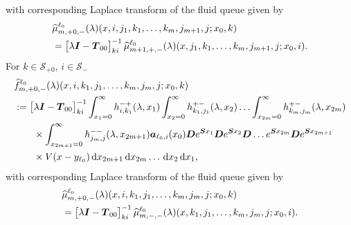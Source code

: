 with corresponding Laplace transform of the fluid queue given by 
\begin{align}
		&\widehat{\mu}_{m,+0,-}^{\ell_0}(\lambda)(x,i,j_1,k_1,\dots,k_m,j_{m+1},j;x_0,k) \nonumber 
		\\&=\begin{bmatrix} \lambda \boldsymbol I - \boldsymbol T_{00} \end{bmatrix}^{-1}_{ki}\widehat{\mu}_{m+1,+,-}^{\ell_0}(\lambda)(x,j_1,k_1,\dots,k_m,j_{m+1},j;x_0,i).
		\label{eqn: k0jJ0asfcavv134asdga}
\end{align} 
For \(k\in\mathcal S_{+0}\), \(i\in\mathcal S_-\)
\begin{align}
	&\widehat{f}_{m,+0,-}^{\ell_0}(\lambda)(x,i,k_1,j_1,\dots,k_{m},j_{m},j;x_0,k)\nonumber 
	\\&:=\begin{bmatrix} \lambda \boldsymbol I - \boldsymbol T_{00} \end{bmatrix}^{-1}_{ki}\int_{x_1=0}^\infty h^{-+}_{i,k_{1}}(\lambda,x_1)\nonumber
	\int_{x_2=0}^\infty h^{+-}_{k_1,j_1}(\lambda,x_2)
	\hdots \int_{x_{2m}=0}^\infty h^{+-}_{k_{m},j_{m}}(\lambda, x_{2m}) 
	\\&\qquad \times\int_{x_{2m+1}=0}^\infty h^{--}_{j_{m},j}(\lambda,x_{2m+1})
	 \boldsymbol   a_{\ell_0,i}(x_0)\boldsymbol De^{\boldsymbol{S}x_1} \boldsymbol{D} e^{\boldsymbol{S}x_2} \boldsymbol{D}\dots e^{\boldsymbol{S}x_{2m}}  \boldsymbol{D}e^{\boldsymbol{S}x_{2m+1}} \nonumber 
	 \\&\qquad{}\times V(x-y_{\ell_0})  \, \mathrm{d} x_{2m+1} \, \mathrm{d} x_{2m}\dots\, \mathrm{d} x_2 \, \mathrm{d} x_1,\label{eqn: kvv0jJ0AfAAaAA}
\end{align}
with corresponding Laplace transform of the fluid queue given by 
\begin{align}
		&\widehat{\mu}_{m,+0,-}^{\ell_0}(\lambda)(x,i,k_1,j_1,\dots,k_{m},j_{m},j;x_0,k) \nonumber 
		\\&=\begin{bmatrix} \lambda \boldsymbol I - \boldsymbol T_{00} \end{bmatrix}^{-1}_{ki}\widehat{\mu}_{m,-,-}^{\ell_0}(\lambda)(x,k_1,j_1,\dots,k_{m},j_{m},j;x_0,i).
\end{align}  

